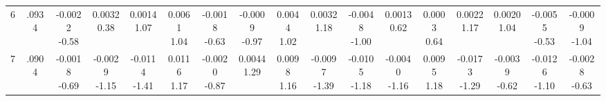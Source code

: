 \begin{landscape}
\begin{center}
{\begin{adjustbox}{max width=\textheight}
\begin{tabular}{lcccccccccccccccc}
6 & .0934 & \shortstack{-0.0022\\-0.58} & \shortstack{0.0032\\0.38} & \shortstack{0.0014\\1.07} & \shortstack{0.0061\\1.04} & \shortstack{-0.0018\\-0.63} & \shortstack{-0.0009\\-0.97} & \shortstack{0.0044\\1.02} & \shortstack{0.0032\\1.18} & \shortstack{-0.0048\\-1.00} & \shortstack{0.0013\\0.62} & \shortstack{0.0003\\0.64} & \shortstack{0.0022\\1.17} & \shortstack{0.0020\\1.04} & \shortstack{-0.0055\\-0.53} & \shortstack{-0.0009\\-1.04} \\
7 & .0904 & \shortstack{-0.0018\\-0.69} & \shortstack{-0.0029\\-1.15} & \shortstack{-0.0114\\-1.41} & \shortstack{0.0116\\1.17} & \shortstack{-0.0020\\-0.87} & \shortstack{0.0044\\1.29} & \shortstack{0.0098\\1.16} & \shortstack{-0.0097\\-1.39} & \shortstack{-0.0105\\-1.18} & \shortstack{-0.0040\\-1.16} & \shortstack{0.0095\\1.18} & \shortstack{-0.0173\\-1.29} & \shortstack{-0.0039\\-0.62} & \shortstack{-0.0126\\-1.10} & \shortstack{-0.0028\\-0.63} \\

\end{tabular}
\end{adjustbox}}
\end{center}
\end{landscape}
